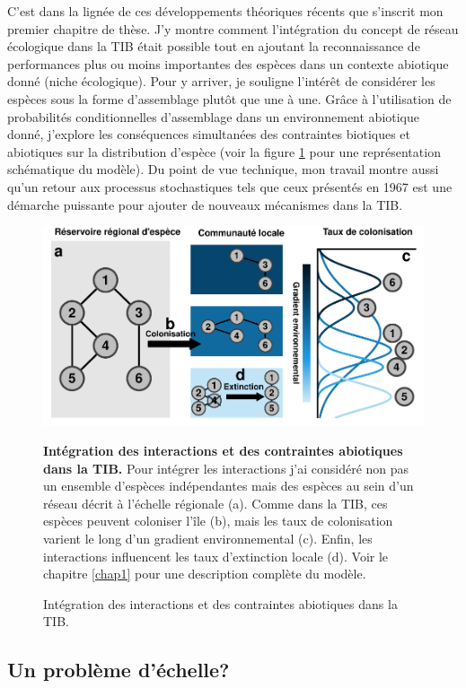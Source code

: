 C'est dans la lignée de ces développements théoriques récents que
s'inscrit mon premier chapitre de thèse. J'y montre comment
l'intégration du concept de réseau écologique dans la TIB était possible
tout en ajoutant la reconnaissance de performances plus ou moins
importantes des espèces dans un contexte abiotique donné (niche
écologique). Pour y arriver, je souligne l'intérêt de considérer les
espèces sous la forme d'assemblage plutôt que une à une. Grâce à
l'utilisation de probabilités conditionnelles d'assemblage dans un
environnement abiotique donné, j'explore les conséquences simultanées
des contraintes biotiques et abiotiques sur la distribution d'espèce
(voir la figure \ref{fig:figGTIB} pour une représentation schématique du
modèle). Du point de vue technique, mon travail montre aussi qu'un
retour aux processus stochastiques tels que ceux présentés en 1967 est
une démarche puissante pour ajouter de nouveaux mécanismes dans la TIB.

\begin{figure}
\centering
\includegraphics{fig/fig2.pdf}
\caption{Intégration des interactions et des contraintes abiotiques dans la TIB.}{\textbf{Intégration des interactions et des contraintes
abiotiques dans la TIB.} Pour intégrer les interactions j'ai considéré
non pas un ensemble d'espèces indépendantes mais des espèces au sein
d'un réseau décrit à l'échelle régionale (a). Comme dans la TIB, ces
espèces peuvent coloniser l'île (b), mais les taux de colonisation
varient le long d'un gradient environnemental (c). Enfin, les
interactions influencent les taux d'extinction locale (d). Voir le
chapitre \ref{chap1} pour une description complète du
modèle.\label{fig:figGTIB}}
\end{figure}

\subsection*{Un problème d'échelle?}\label{un-probluxe8me-duxe9chelle}

